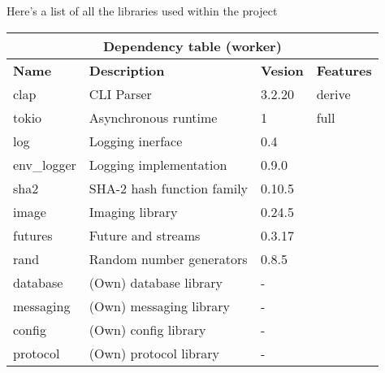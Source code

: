 \documentclass[../documentation.tex]{subfiles}
\begin{document}
Here's a list of all the libraries used within the project

\bgroup{}
\def\arraystretch{1.5}
\begin{center}
    \begin{tabular}{ |p{2cm}|p{4cm}|p{1.5cm}|p{2cm}| }
        \hline
        \multicolumn{4}{|c|}{\textbf{Dependency table (worker)}} \\
        \hline
        \textbf{Name} & \textbf{Description} & \textbf{Vesion} & \textbf{Features} \\
        \hline
        clap & CLI Parser & 3.2.20 & derive \\
        \hline
        tokio & Asynchronous runtime & 1 & full \\
        \hline
        log & Logging inerface & 0.4 & \\
        \hline
        env\_logger & Logging implementation & 0.9.0 & \\
        \hline
        sha2 & SHA-2 hash function family & 0.10.5 & \\
        \hline
        image & Imaging library & 0.24.5 & \\
        \hline
        futures & Future and streams & 0.3.17 & \\
        \hline
        rand & Random number generators & 0.8.5 & \\
        \hline
        database & (Own) database library & - & \\
        \hline
        messaging & (Own) messaging library & - & \\
        \hline
        config & (Own) config library & - & \\
        \hline
        protocol & (Own) protocol library & - & \\
        \hline
    \end{tabular}
\end{center}
\egroup{}
\end{document}
